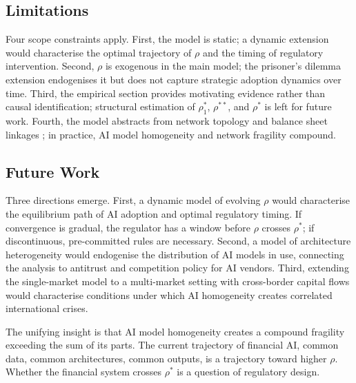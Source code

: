 \subsection{Limitations}

Four scope constraints apply. First, the model is static; a dynamic extension would characterise the optimal trajectory of $\rho$ and the timing of regulatory intervention. Second, $\rho$ is exogenous in the main model; the prisoner's dilemma extension endogenises it but does not capture strategic adoption dynamics over time. Third, the empirical section provides motivating evidence rather than causal identification; structural estimation of $\rho_1^*$, $\rho^{**}$, and $\rho^*$ is left for future work. Fourth, the model abstracts from network topology and balance sheet linkages \citep{acemoglu2015}; in practice, AI model homogeneity and network fragility compound.

\subsection{Future Work}

Three directions emerge. First, a dynamic model of evolving $\rho$ would characterise the equilibrium path of AI adoption and optimal regulatory timing. If convergence is gradual, the regulator has a window before $\rho$ crosses $\rho^*$; if discontinuous, pre-committed rules are necessary. Second, a model of architecture heterogeneity would endogenise the distribution of AI models in use, connecting the analysis to antitrust and competition policy for AI vendors. Third, extending the single-market model to a multi-market setting with cross-border capital flows would characterise conditions under which AI homogeneity creates correlated international crises.

The unifying insight is that AI model homogeneity creates a compound fragility exceeding the sum of its parts. The current trajectory of financial AI, common data, common architectures, common outputs, is a trajectory toward higher $\rho$. Whether the financial system crosses $\rho^*$ is a question of regulatory design.
